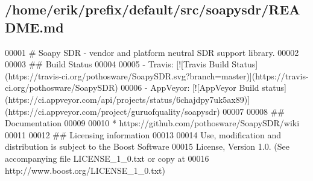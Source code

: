 \subsection{/home/erik/prefix/default/src/soapysdr/\+R\+E\+A\+D\+ME.md}

\begin{DoxyCode}
00001 # Soapy SDR - vendor and platform neutral SDR support library.
00002 
00003 ## Build Status
00004 
00005 - Travis: [![Travis Build
       Status](https://travis-ci.org/pothosware/SoapySDR.svg?branch=master)](https://travis-ci.org/pothosware/SoapySDR)
00006 - AppVeyor: [![AppVeyor Build
       status](https://ci.appveyor.com/api/projects/status/6chajdpy7uk5ax89)](https://ci.appveyor.com/project/guruofquality/soapysdr)
00007 
00008 ## Documentation
00009 
00010 * https://github.com/pothosware/SoapySDR/wiki
00011 
00012 ## Licensing information
00013 
00014 Use, modification and distribution is subject to the Boost Software
00015 License, Version 1.0. (See accompanying file LICENSE\_1\_0.txt or copy at
00016 http://www.boost.org/LICENSE\_1\_0.txt)
\end{DoxyCode}
